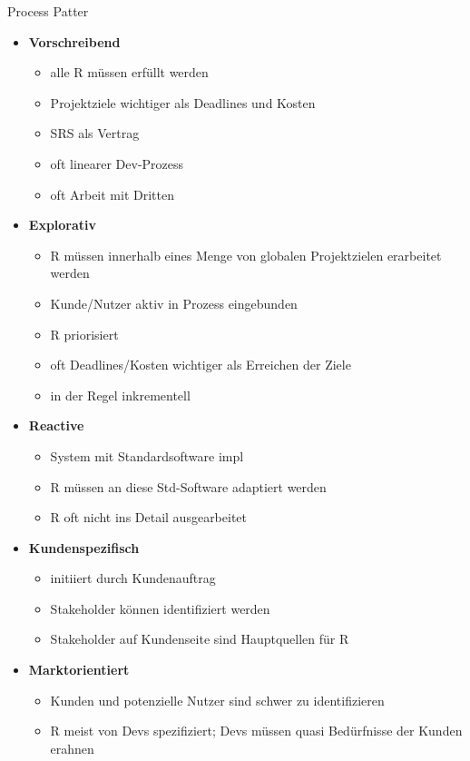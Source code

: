Process Patter
\begin{itemize}
	\item \textbf{Vorschreibend}
	\begin{itemize}
		\item alle R müssen erfüllt werden
		\item Projektziele wichtiger als Deadlines und Kosten
		\item SRS als Vertrag 
		\item oft linearer Dev-Prozess
		\item oft Arbeit mit Dritten
	\end{itemize}
	
	\item \textbf{Explorativ}
	\begin{itemize}
		\item R müssen innerhalb eines Menge von globalen Projektzielen erarbeitet werden
		\item Kunde/Nutzer aktiv in Prozess eingebunden
		\item R priorisiert
		\item oft Deadlines/Kosten wichtiger als Erreichen der Ziele
		\item in der Regel inkrementell
	\end{itemize}
	
	\item \textbf{Reactive}
	\begin{itemize}
		\item System mit Standardsoftware impl
		\item R müssen an diese Std-Software adaptiert werden
		\item R oft nicht ins Detail ausgearbeitet
	\end{itemize}
	
	
	\item \textbf{Kundenspezifisch}
	\begin{itemize}
		\item initiiert durch Kundenauftrag
		\item Stakeholder können identifiziert werden
		\item Stakeholder auf Kundenseite sind Hauptquellen für R
	\end{itemize}
	
	\item \textbf{Marktorientiert}
	\begin{itemize}
		\item Kunden und potenzielle Nutzer sind schwer zu identifizieren
		\item R meist von Devs spezifiziert; Devs müssen quasi Bedürfnisse der Kunden erahnen
	\end{itemize}
\end{itemize}

